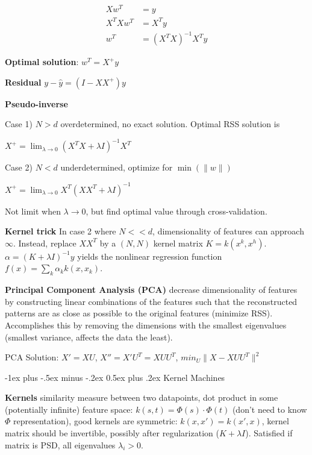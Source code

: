 \documentclass[10pt,landscape]{article}
\makeatletter
\renewcommand{\section}{\@startsection{section}{1}{0mm}%
                                {-1ex plus -.5ex minus -.2ex}%
                                {0.5ex plus .2ex}%
                                {\normalfont\large\bfseries}}
\makeatother
\begin{document}
\begin{multicols}{3}
\begin{align*}
Xw^T &= y \\
X^T X w^T &= X^T y \\
w^T &= (X^T X)^{-1} X^T y
\end{align*}

\textbf{Optimal solution}: $w^T = X^+ y$

\textbf{Residual} $y-\hat{y} = (I-XX^+)y$

\textbf{Pseudo-inverse}

Case 1) $N > d$ overdetermined, no exact solution. Optimal RSS solution is

$X^+ = \lim_{\lambda \rightarrow 0} (X^T X + \lambda I)^{-1} X^T$

Case 2) $N < d$ underdetermined, optimize for $\min(\lVert w \rVert)$

$X^+ = \lim_{\lambda \rightarrow 0} X^T(XX^T + \lambda I)^{-1}$

Not limit when $\lambda \rightarrow 0$, but find optimal value through cross-validation.

\textbf{Kernel trick} In case 2 where $N << d$, dimensionality of features can approach $\infty$. Instead, replace $XX^T$ by a $(N, N)$ kernel matrix $K = k(x^k, x^h)$. $\alpha = (K + \lambda I)^{-1} y$ yields the nonlinear regression function $f(x) = \sum_k \alpha_k k(x, x_k)$.

\textbf{Principal Component Analysis (PCA)} decrease dimensionality of features by constructing linear combinations of the features such that the reconstructed patterns are as close as possible to the original features (minimize RSS). Accomplishes this by removing the dimensions with the smallest eigenvalues (smallest variance, affects the data the least).

PCA Solution: $X' = XU$, $X'' = X' U^T = XUU^T$, $min_U \lVert X - XUU^T \rVert^2$


\section{Kernel Machines}

\textbf{Kernels} similarity measure between two datapoints, dot product in some (potentially infinite) feature space: $k(s, t) = \Phi(s) \cdot \Phi(t)$ (don't need to know $\Phi$ representation), good kernels are symmetric: $k(x, x') = k(x', x)$, kernel matrix should be invertible, possibly after regularization ($K+\lambda I$). Satisfied if matrix is PSD, all eigenvalues $\lambda_i > 0$.


\end{multicols}
\end{document}
